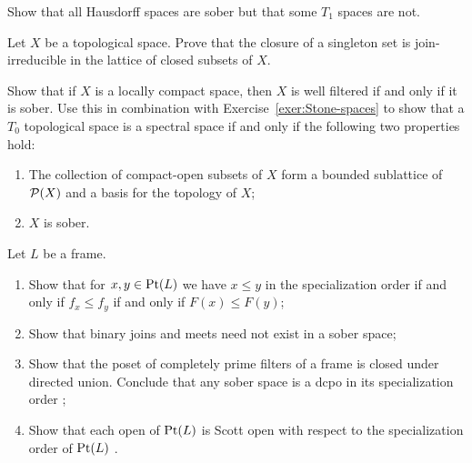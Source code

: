 \begin{exercise}\label{exer:sobriety}
Show that all Hausdorff spaces are sober but that some $T_1$ spaces are not.
\end{exercise}
\begin{exercise}\label{ex:singleton-joinirr}
  Let $X$ be a topological space.
  Prove that the closure of a singleton set is join-irreducible in the lattice of closed subsets of $X$.
\end{exercise}
\begin{exercise}\label{exer:sober-vs-wellfiltered}
Show that if $X$ is a locally compact space, then $X$ is well filtered if and only if it is sober. Use this in combination with Exercise~\ref{exer:Stone-spaces} to show that a $T_0$ topological space is a spectral space if and only if the following two properties hold:
\begin{enumerate}
\item The collection of compact-open subsets of $X$ form a bounded sublattice of $\mathcal{P}(X)$ and a basis for the topology of $X$;
\item $X$ is sober.
\end{enumerate}
\end{exercise}

\begin{exercise}\label{exer:sober-and-order}
Let $L$ be a frame.
\begin{enumerate}
\item Show that for $x,y\in \mathrm{Pt}(L)$ we have $x\leq y$ in the specialization order if and only if $f_x\leq f_y$ if and only if $F(x)\leq F(y)$;
\item Show that binary joins and meets need not exist in a sober space;
\item Show that the poset of completely prime filters of a frame is closed under directed union. Conclude that any sober space is a dcpo in its specialization order %
;
\item Show that each open of $\mathrm{Pt}(L)$ is Scott open with respect to the specialization order of $\mathrm{Pt}(L)$ %
.
\end{enumerate}
\end{exercise}

